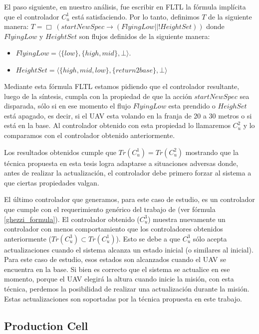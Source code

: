 El paso siguiente, en nuestro análisis, fue escribir en FLTL la fórmula implícita que el controlador $C_u^1$ está
satisfaciendo. Por lo tanto, definimos $T$ de la siguiente manera: $T = \Box\ (startNewSpec
\rightarrow (FlyingLow || !HeightSet))$ donde $FlyingLow$ y $HeightSet$ son flujos definidos de la siguiente manera: 

\begin{itemize}
\itemsep-4mm
\item $FlyingLow = \langle \{low\},\{high,mid\},\bot\rangle$.
\item $HeightSet = \langle \{high,mid,low\},\{return2base\},\bot\rangle$
\end{itemize}

Mediante esta fórmula FLTL estamos pidiendo que el controlador resultante, luego de la síntesis, cumpla con la propiedad
de que la acción $startNewSpec$ sea disparada, sólo si en ese momento el flujo $FlyingLow$ esta prendido o $HeighSet$
está apagado, es decir, si el UAV esta volando en la franja de 20 a 30 metros o si está en la base. Al controlador
obtenido con esta propiedad lo llamaremos $C_u^2$ y lo comparamos con el controlador obtenido anteriormente.

Los resultados obtenidos cumple que $Tr(C_u^1) = Tr(C_u^2)$ mostrando que la técnica propuesta en esta tesis logra
adaptarse a situaciones adversas donde, antes de realizar la actualización, el controlador debe primero forzar al
sistema a que ciertas propiedades valgan.

El último controlador que generamos, para este caso de estudio, es un controlador que cumple con el requerimiento genérico
del trabajo de \cite{6224401} (ver fórmula \ref{ghezzi_formula}). El controlador obtenido ($C_u^3$) muestra nuevamente
un controlador con menos comportamiento que los controladores obtenidos anteriormente ($Tr(C_u^3) \subset Tr(C_u^1)$).
Esto se debe a que $C_u^3$ sólo acepta actualizaciones cuando el sistema alcanza un estado inicial (o similares al
inicial). Para este caso de estudio, esos estados son alcanzados cuando el UAV se encuentra en la base. Si bien es
correcto que el sistema se actualice en ese momento, porque el UAV elegirá la altura cuando inicie la misión, con esta
técnica, perdemos la posibilidad de realizar una actualización durante la misión. Estas actualizaciones son
soportadas por la técnica propuesta en este trabajo.

\subsection{Production Cell}

